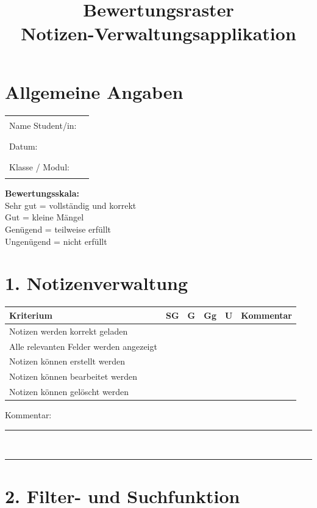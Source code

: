 \documentclass[a4paper,12pt]{article}
\title{Bewertungsraster\\Notizen-Verwaltungsapplikation}
\date{}
\begin{document}
\maketitle

\section*{Allgemeine Angaben}

\begin{tabular}{ll}
Name Student/in: & \rule{8cm}{0.4pt} \\
Datum: & \rule{8cm}{0.4pt} \\
Klasse / Modul: & \rule{8cm}{0.4pt} \\
\end{tabular}

\vspace{0.5cm}

\textbf{Bewertungsskala:} \\
Sehr gut = vollständig und korrekt \\
Gut = kleine Mängel \\
Genügend = teilweise erfüllt \\
Ungenügend = nicht erfüllt \\

\section*{1. Notizenverwaltung}

\begin{longtable}{|p{6cm}|c|c|c|c|p{4cm}|}
\hline
Kriterium & SG & G & Gg & U & Kommentar \\
\hline
Notizen werden korrekt geladen & & & & & \\
\hline
Alle relevanten Felder werden angezeigt & & & & & \\
\hline
Notizen können erstellt werden & & & & & \\
\hline
Notizen können bearbeitet werden & & & & & \\
\hline
Notizen können gelöscht werden & & & & & \\
\hline
\end{longtable}

Kommentar:\\
\rule{\textwidth}{0.4pt}\\
\rule{\textwidth}{0.4pt}

\section*{2. Filter- und Suchfunktion}
\end{document}
